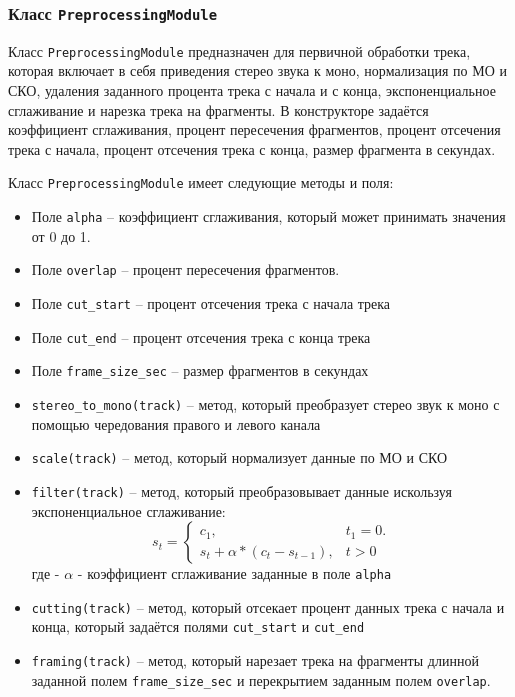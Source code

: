 \subsubsection{Класс \texttt{PreprocessingModule}}

Класс \texttt{PreprocessingModule} предназначен для первичной обработки трека, которая включает в себя приведения стерео звука к моно, нормализация по МО и СКО, 
удаления заданного процента трека с начала и с конца, экспоненциальное сглаживание и нарезка трека на фрагменты. В конструкторе задаётся коэффициент сглаживания, процент пересечения фрагментов, процент отсечения трека с начала, процент отсечения трека с конца, размер фрагмента в секундах.

Класс \texttt{PreprocessingModule} имеет следующие методы и поля:

\begin{itemize}
\item{Поле \texttt{alpha} -- коэффициент сглаживания, который может принимать значения от 0 до 1.}
\item{Поле \texttt{overlap} -- процент пересечения фрагментов.}
\item{Поле \texttt{cut\_start} -- процент отсечения трека с начала трека}
\item{Поле \texttt{cut\_end} -- процент отсечения трека с конца трека}
\item{Поле \texttt{frame\_size\_sec} -- размер фрагментов в секундах}
\item{\texttt{stereo\_to\_mono(track)} -- метод, который преобразует стерео звук к моно с помощью чередования правого и левого канала}
\item{\texttt{scale(track)} -- метод, который нормализует данные по МО и СКО}
\item{\texttt{filter(track)} -- метод, который преобразовывает данные искользуя экспоненциальное сглаживание:
\begin{equation}\label{eq:sfm}
s_t = \begin{cases} 
c_1, & t_1 = 0. \\
s_{t} + \alpha * (c_t - s_{t-1}), & t > 0
\end{cases} 
\end{equation}
где - $\alpha$ - коэффициент сглаживание заданные в поле \texttt{alpha}}
\item{\texttt{cutting(track)} -- метод, который отсекает процент данных трека с начала и конца, который задаётся полями \texttt{cut\_start} и \texttt{cut\_end}}
\item{\texttt{framing(track)} -- метод, который нарезает трека на фрагменты длинной заданной полем \texttt{frame\_size\_sec} и перекрытием заданным полем \texttt{overlap}.}
\end{itemize}


